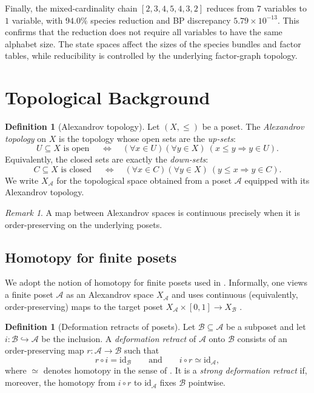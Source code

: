 \documentclass{article}
\theoremstyle{plain}
\theoremstyle{definition}
\newtheorem{definition}[theorem]{Definition}
\theoremstyle{remark}
\newtheorem{remark}[theorem]{Remark}
\newcommand{\B}{\mathcal{B}}
\newcommand{\id}{\textrm{id}}
\newcommand{\A}{\mathcal{A}}
\newcommand{\<}{\langle}
\renewcommand{\>}{\rangle}
\begin{document}
Finally, the mixed-cardinality chain
$[2,3,4,5,4,3,2]$ reduces from $7$ variables to $1$ variable, with
$94.0\%$ species reduction and BP discrepancy $5.79 \times 10^{-13}$.
This confirms that the reduction does not require all variables to have
the same alphabet size. The state spaces affect the sizes of the species
bundles and factor tables, while reducibility is controlled by the
underlying factor-graph topology.

\section{Topological Background}

\begin{definition}[Alexandrov topology]\label{def:alexandrov}
Let $(X,\le)$ be a poset. The \emph{Alexandrov topology} on $X$ is the topology whose open sets are the \emph{up-sets}:
\[
U\subseteq X \text{ is open } \quad \Longleftrightarrow \quad (\forall x\in U)(\forall y\in X)\ (x\le y \Rightarrow y\in U).
\]
Equivalently, the closed sets are exactly the \emph{down-sets}:
\[
C\subseteq X \text{ is closed } \quad \Longleftrightarrow \quad (\forall x\in C)(\forall y\in X)\ (y\le x \Rightarrow y\in C).
\]
We write $X_\A$ for the topological space obtained from a poset $\A$ equipped with its Alexandrov topology.
\end{definition}

\begin{remark}\label{rem:alexandrov-continuous}
A map between Alexandrov spaces is continuous precisely when it is order-preserving on the underlying posets.
\end{remark}


\subsection*{Homotopy for finite posets}
We adopt the notion of homotopy for finite posets used in \cite{sergeantperthuis2025minimacriticalpointsbethe}. 
Informally, one views a finite poset $\A$ as an Alexandrov space $X_\A$ and uses continuous (equivalently, order-preserving) maps to the target poset
$X_\A\times[0,1]\to X_\B$ .

\begin{definition}[Deformation retracts of posets]\label{def:deformation-retract}
Let $\B\subseteq \A$ be a subposet and let $i:\B\hookrightarrow\A$ be the inclusion.
A \emph{deformation retract} of $\A$ onto $\B$ consists of an order-preserving map $r:\A\to\B$ such that
\[
r\circ i = \id_{\B}
\qquad\text{and}\qquad
i\circ r \simeq \id_{\A},
\]
where $\simeq$ denotes homotopy in the sense of \cite{sergeantperthuis2025minimacriticalpointsbethe}.
It is a \emph{strong deformation retract} if, moreover, the homotopy from $i\circ r$ to $\id_{\A}$ fixes $\B$ pointwise.
\end{definition}
\end{document}
